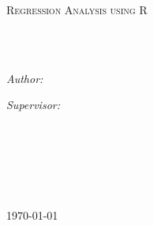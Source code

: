 \documentclass[
11pt, %
english, %
singlespacing, %
headsepline, %
]{MastersDoctoralThesis} %
\author{Junjie \textsc{LIU} \\ Yi \textsc{He}} %
\begin{document}
\frontmatter %

\pagestyle{plain} %


\begin{titlepage}
\begin{center}

\vspace*{.06\textheight}
{\scshape\LARGE \univname\par}\vspace{1.5cm} %
\textsc{\Large Regression Analysis using R}\\[0.5cm] %

\HRule \\[0.4cm] %
{\huge \bfseries \ttitle\par}\vspace{0.4cm} %
\HRule \\[1.5cm] %

\begin{minipage}[t]{0.4\textwidth}
\begin{flushleft} \large
\emph{Author:}\\
{\authorname} %
\end{flushleft}
\end{minipage}
\begin{minipage}[t]{0.4\textwidth}
\begin{flushright} \large
\emph{Supervisor:} \\
{\supname} %
\end{flushright}
\end{minipage}\\[3cm]

\vfill

\groupname\\\deptname\\\facname\\[2cm] %


\vfill

{\large \today}\\[4cm] %

\vfill
\end{center}
\end{titlepage}
\end{document}
